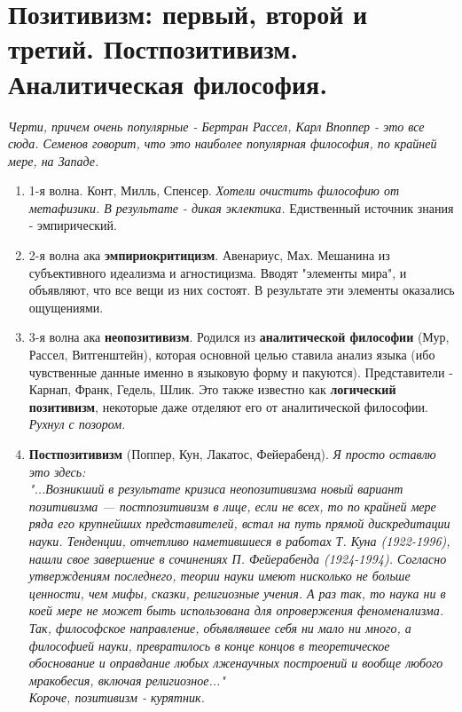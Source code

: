 \documentclass[12pt,a4paper]{article}
\begin{document}
\section{Позитивизм: первый, второй и третий. Постпозитивизм. Аналитическая философия.}
\textit{Черти, причем очень популярные - Бертран Рассел, Карл Впоппер - это все сюда. Семенов говорит, что это наиболее популярная философия, по крайней мере, на Западе.}
\begin{enumerate}

\item 1-я волна. Конт, Милль, Спенсер.
\textit{Хотели очистить философию от метафизики. В результате - дикая эклектика.} Едиственный источник знания - эмпирический.
\item 2-я волна ака \textbf{эмпириокритицизм}. Авенариус, Мах.
Мешанина из субъективного идеализма и агностицизма. Вводят "элементы мира", и объявляют, что все вещи из них состоят. В результате эти элементы оказались ощущениями.
\item 3-я волна ака \textbf{неопозитивизм}. Родился из \textbf{аналитической философии} (Мур, Рассел, Витгенштейн), которая основной целью ставила  анализ языка (ибо чувственные данные именно в языковую форму и пакуются). Представители - Карнап, Франк, Гедель, Шлик. Это также известно как \textbf{логический позитивизм}, некоторые даже отделяют его от аналитической философии. \textit{Рухнул с позором}.
\item \textbf{Постпозитивизм} (Поппер, Кун, Лакатос, Фейерабенд).
\textit{Я просто оставлю это здесь:\\
"...Возникший в результате кризиса неопозитивизма новый вариант позитивизма —
постпозитивизм в лице, если не всех, то по крайней мере ряда его крупнейших
представителей, встал на путь прямой дискредитации науки. Тенденции, отчетливо
наметившиеся в работах Т. Куна (1922-1996), нашли свое завершение в сочинениях
П. Фейерабенда (1924-1994). Согласно утверждениям последнего, теории науки
имеют нисколько не больше ценности, чем мифы, сказки, религиозные учения. А
раз так, то наука ни в коей мере не может быть использована для опровержения
феноменализма. Так, философское направление, объявлявшее себя ни мало ни
много, а философией науки, превратилось в конце концов в теоретическое
обоснование и оправдание любых лженаучных построений и вообще любого
мракобесия, включая религиозное..."\\
Короче, позитивизм - курятник.
}
\end{enumerate}

\newpage
{}
\end{document}
